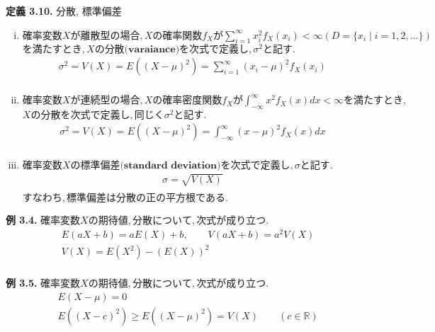 \documentclass[dvipdfmx,10pt, a4j]{jarticle}
\theoremstyle{definition}
\begin{document}
\noindent
\textbf{定義 3.10.} 分散, 標準偏差\\
\begin{enumerate}[i)]
    \item $確率変数X が離散型の場合, X の確率関数 f_X が \sum_{i=1}^{\infty}{x_i^{2}f_X(x_i)} < \infty (D= \{x_i \mid i=1,2,\dots \})$
          $を満たすとき, Xの \textbf{分散(varaiance)}を次式で定義し, \sigma^{2}と記す.$\\
          \begin{align*}
              \sigma^{2} = V(X) = E((X-\mu)^2) = \sum_{i=1}^{\infty}{(x_i - \mu)^{2}f_X(x_i)} \\
          \end{align*}
    \item $確率変数Xが連続型の場合, X の確率密度関数f_X が \int_{-\infty}^{\infty}{x^2f_X(x)dx} < \infty を満たすとき,$
          $Xの \textbf{分散}を次式で定義し, 同じく \sigma^{2}と記す.$\\
          \begin{align*}
              \sigma^{2} = V(X) = E((X-\mu)^2) = \int_{-\infty}^{\infty}{(x-\mu)^2f_X(x)dx} \\
          \end{align*}
    \item $確率変数X の \textbf{標準偏差(standard deviation)} を次式で定義し, \sigma と記す.$\\
          \begin{align*}
              \sigma = \sqrt{V(X)} \\
          \end{align*}
          $すなわち, 標準偏差は分散の正の平方根である.$\\
\end{enumerate}

\noindent
\textbf{例 3.4.} $確率変数X の期待値, 分散について, 次式が成り立つ.$\\
\begin{align*}
     & E(aX + b) = aE(X) + b, \qquad V(aX + b) = a^2V(X) \\
     & V(X) = E(X^2) - (E(X))^2                          \\
\end{align*}

\noindent
\textbf{例 3.5.} $確率変数X の期待値, 分散について, 次式が成り立つ.$\\
\begin{align*}
     & E(X - \mu) = 0                                                    \\
     & E((X - c)^2) \geq E((X - \mu)^2) = V(X) \qquad (c \in \mathbb{R}) \\
\end{align*}
\end{document}

